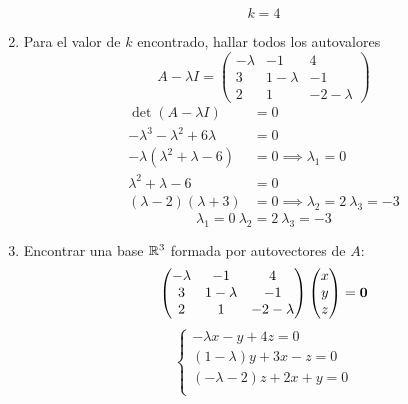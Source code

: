 \documentclass[../practica.root.tex]{subfiles}
\begin{document}
\begin{enumerate}
          \[ \boxed{ k = 4 } \]
    \item Para el valor de \( k \) encontrado, hallar todos los autovalores
          \[
              A - \lambda I=
              \begin{pmatrix}
                  -\lambda & -1        & 4          \\
                  3        & 1-\lambda & -1         \\
                  2        & 1         & -2-\lambda
              \end{pmatrix}
          \]
          \begin{align*}
              \det(A - \lambda I)              & = 0                                          \\
              -\lambda^3 -\lambda^2 + 6\lambda & = 0                                          \\
              -\lambda(\lambda^2 + \lambda -6) & = 0 \implies \lambda_1 = 0                   \\
              \lambda^2 + \lambda -6           & = 0                                          \\
              (\lambda - 2)(\lambda + 3)       & = 0 \implies \lambda_2 = 2 \  \lambda_3 = -3
          \end{align*}
          \[ \boxed{\lambda_1 = 0 \ \lambda_2 = 2 \ \lambda_3 = -3} \]
    \item Encontrar una base \( \mathbb{R}^3 \) formada por autovectores de \( A \):
          \[
              \begin{pmatrix}
                  -\lambda & -1        & 4          \\
                  3        & 1-\lambda & -1         \\
                  2        & 1         & -2-\lambda
              \end{pmatrix}
              \begin{pmatrix}
                  x \\ y \\ z
              \end{pmatrix}
              =
              \mathbf{0}
          \] \[
              \begin{cases}
                  -\lambda x - y + 4z = 0       \\
                  (1 - \lambda) y + 3x - z = 0  \\
                  (-\lambda - 2) z + 2x + y = 0 \\
              \end{cases}
\]
\end{enumerate}
\end{document}
